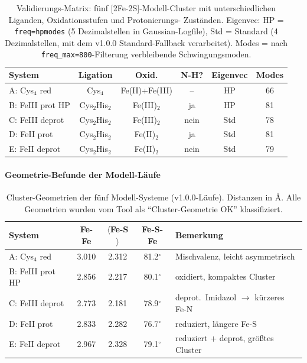 \documentclass[11pt,a4paper,twoside]{article}
\providecommand{\angstrom}{\text{\AA}}    %
\theoremstyle{remark}
\begin{document}
\begin{table}[h]
\centering
\small
\begin{tabular}{|l|c|c|c|c|c|}
\hline
\textbf{System} & \textbf{Ligation} & \textbf{Oxid.} &
  \textbf{N-H?} & \textbf{Eigenvec} & \textbf{Modes} \\
\hline
A: Cys$_4$ red       & Cys$_4$    & Fe(II)+Fe(III) & --   & HP   & 66 \\
B: FeIII prot HP   & Cys$_2$His$_2$ & Fe(III)$_2$    & ja   & HP   & 81 \\
C: FeIII deprot      & Cys$_2$His$_2$ & Fe(III)$_2$    & nein & Std  & 78 \\
D: FeII prot         & Cys$_2$His$_2$ & Fe(II)$_2$     & ja   & Std  & 81 \\
E: FeII deprot       & Cys$_2$His$_2$ & Fe(II)$_2$     & nein & Std  & 79 \\
\hline
\end{tabular}
\caption{Validierungs-Matrix: f\"unf [2Fe-2S]-Modell-Cluster mit
unterschiedlichen Liganden, Oxidationsstufen und Protonierungs-
Zust\"anden. Eigenvec: HP = \texttt{freq=hpmodes} (5 Dezimalstellen
in Gaussian-Logfile), Std = Standard (4 Dezimalstellen, mit dem
v1.0.0 Standard-Fallback verarbeitet). Modes = nach
\texttt{freq\_max=800}-Filterung verbleibende Schwingungsmoden.}
\label{tab:validierung-matrix}
\end{table}

\paragraph{Geometrie-Befunde der Modell-L\"aufe}

\begin{table}[h]
\centering
\small
\begin{tabular}{|l|c|c|c|l|}
\hline
\textbf{System} & \textbf{Fe-Fe} & \textbf{$\langle$Fe-S$\rangle$} &
  \textbf{Fe-S-Fe} & \textbf{Bemerkung} \\
\hline
A: Cys$_4$ red    & 3.010 & 2.312 & 81.2$^{\circ}$ & Mischvalenz, leicht asymmetrisch \\
B: FeIII prot HP  & 2.856 & 2.217 & 80.1$^{\circ}$ & oxidiert, kompaktes Cluster \\
C: FeIII deprot   & 2.773 & 2.181 & 78.9$^{\circ}$ & deprot.\ Imidazol $\to$ k\"urzeres Fe-N \\
D: FeII prot      & 2.833 & 2.282 & 76.7$^{\circ}$ & reduziert, l\"angere Fe-S \\
E: FeII deprot    & 2.967 & 2.328 & 79.1$^{\circ}$ & reduziert + deprot, gr\"o{\ss}tes Cluster \\
\hline
\end{tabular}
\caption{Cluster-Geometrien der f\"unf Modell-Systeme (v1.0.0-L\"aufe).
Distanzen in $\angstrom$. Alle Geometrien wurden vom Tool als
"`Cluster-Geometrie OK"' klassifiziert.}
\label{tab:val-geometrie}
\end{table}
\end{document}
